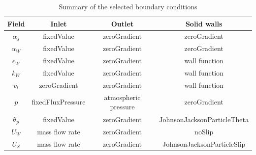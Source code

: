 \documentclass[review,3p,times,12pt]{elsarticle}
\begin{document}
\begin{table}[H]
\begin{center}
\caption{Summary of the selected boundary conditions}
\label{tab:bc}
\begin{tabular}{cccc}
\hline Field & Inlet & Outlet & Solid walls  \\
\hline\(\alpha_{s}\) & fixedValue & zeroGradient & zeroGradient \\
\(\alpha_{W}\) & fixedValue & zeroGradient & zeroGradient \\
\(\epsilon_{W}\) & fixedValue & zeroGradient & wall function\\
\(k_{W}\) & fixedValue & zeroGradient & wall function \\
\(v_{t}\) & zeroGradient & zeroGradient &  wall function \\
\(p\) & fixedFluxPressure & atmospheric pressure & zeroGradient \\
\(\theta_{p}\) & fixedValue & zeroGradient & JohnsonJacksonParticleTheta\\
\(U_{W}\) & mass flow rate  & zeroGradient & noSlip\\
\(U_{S}\) & mass flow rate  & zeroGradient & JohnsonJacksonParticleSlip  \\
\hline
\end{tabular}
\end{center}
\end{table}
\end{document}

